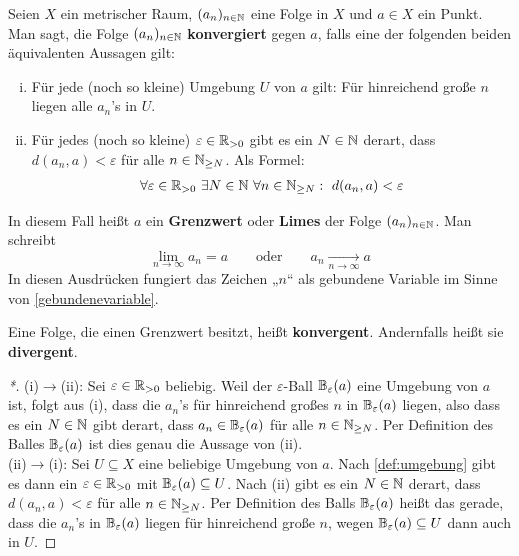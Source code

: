 \begin{defin}[Folgenkonvergenz] \label{def:konvergenz}    
    Seien $X$ ein metrischer Raum, $(a_n)_{n\in \mathbb N}$ eine Folge in $X$ und $a\in X$ ein Punkt. Man sagt, die Folge $(a_n)_{n\in \mathbb N}$ \textbf{konvergiert} gegen $a$, falls eine der folgenden beiden äquivalenten Aussagen gilt:
    \begin{enumerate}[(i)]
        \item Für jede (noch so kleine) Umgebung $U$ von $a$ gilt: Für hinreichend große $n$ liegen alle $a_n$'s in $U$.
        \item Für jedes (noch so kleine) $\varepsilon \in \mathbb R_{>0}$ gibt es ein $N\in \mathbb N$ derart, dass $d(a_n,a)<\varepsilon$ für alle $n\in \mathbb N_{\ge N}$. Als Formel:
        \begin{align*}
            \forall\varepsilon\in \mathbb R_{>0}\ \exists N\in\mathbb N\ \forall n\in \mathbb N_{\ge N}:\ d(a_n,a)<\varepsilon
        \end{align*}
    \end{enumerate}
    In diesem Fall heißt $a$ ein \textbf{Grenzwert} oder \textbf{Limes} der Folge $(a_n)_{n\in \mathbb N}$. Man schreibt
        \[ \lim_{n\to\infty}a_n=a \qquad\text{oder}\qquad a_n\xrightarrow[n\to \infty]{} a \]
    In diesen Ausdrücken fungiert das Zeichen „$n$“ als gebundene Variable im Sinne von \cref{gebundenevariable}.

    Eine Folge, die einen Grenzwert besitzt, heißt \textbf{konvergent}. Andernfalls heißt sie \textbf{divergent}.
\end{defin}
\begin{proof}[*]
    (i)$\to$(ii): Sei $\varepsilon\in \mathbb R_{> 0}$ beliebig. Weil der $\varepsilon$-Ball $\mathbb B_\varepsilon(a)$ eine Umgebung von $a$ ist, folgt aus (i), dass die $a_n$'s für hinreichend großes $n$ in $\mathbb B_\varepsilon(a)$ liegen, also dass es ein $N\in \mathbb N$ gibt derart, dass $a_n\in \mathbb B_\varepsilon(a)$ für alle $n\in \mathbb N_{\ge N}$. Per Definition des Balles $\mathbb B_\varepsilon(a)$ ist dies genau die Aussage von (ii). \\[0.5em]
    (ii)$\to$(i): Sei $U\subseteq X$ eine beliebige Umgebung von $a$. Nach \cref{def:umgebung} gibt es dann ein $\varepsilon\in \mathbb R_{>0}$ mit $\mathbb B_\varepsilon(a)\subseteq U$. Nach (ii) gibt es ein $N\in \mathbb N$ derart, dass $d(a_n,a)<\varepsilon$ für alle $n\in \mathbb N_{\ge N}$. Per Definition des Balls $\mathbb B_\varepsilon(a)$ heißt das gerade, dass die $a_n$'s in $\mathbb B_\varepsilon(a)$ liegen für hinreichend große $n$, wegen $\mathbb B_\varepsilon(a)\subseteq U$ dann auch in $U$.
\end{proof}


